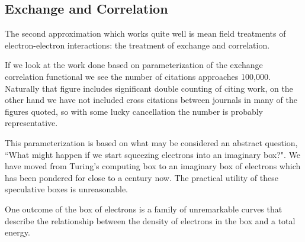 \subsection{Exchange and Correlation}
The second approximation which works quite well is mean field treatments of 
electron-electron interactions: the treatment of exchange and correlation. 

If we look at the work done based on parameterization of the exchange correlation functional 
we see the number of citations approaches 100,000. Naturally that figure includes significant 
double counting of citing work, on the other hand we have not included cross citations 
between journals in many of the figures quoted, so with some lucky 
cancellation the number is probably representative. 

This parameterization is based on what may be considered an abstract question,
``What might happen if we start squeezing electrons into an imaginary box?".
We have moved from Turing's computing box to an imaginary box of electrons
which has been pondered for close to a century now. 
The practical utility of these speculative boxes is unreasonable. 

One outcome of the box of electrons is a family of 
unremarkable curves that describe the relationship between
the density of electrons in the box and a total energy. 


